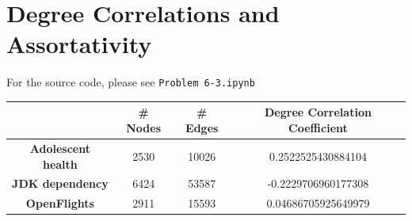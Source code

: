\documentclass[../document.tex]{subfiles}
\begin{document}
\section{Degree Correlations and Assortativity}
For the source code, please see \texttt{Problem 6-3.ipynb}\\

\begin{tabular}{c  c c c}
  & \textbf{\#  Nodes}&  \textbf{\# Edges}&\textbf{ Degree Correlation Coefficient}\\
\hline
 \textbf{ Adolescent health}& 2530& 10026&0.2522525430884104 \\
  \textbf{JDK dependency}&6424 &53587 &  -0.2229706960177308\\
  \textbf{OpenFlights}&2911 &15593 & 0.04686705925649979\\
\end{tabular}
\end{document}
